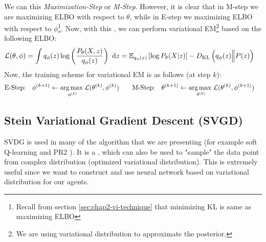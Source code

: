 We can this \textit{Maximization-Step} or \textit{M-Step}. However, it is clear that in M-step we are maximizing ELBO with respect to $\theta$, while in E-step we maximizing ELBO with respect to $\phi$\footnote{Recall from section \ref{sec:chap2-vi-technique} that minimizing KL is same as maximizing ELBO}. Now, with this , we can perform variational EM\footnote{We are using variational distribution to approximate the posterior.} based on the following ELBO:
\begin{equation}
    \begin{aligned}
        \mathcal{L}(\theta, \phi) &= \int q_{\phi}(z) \log \left( \frac{P_{\theta}(X, z)}{q_{\phi}(z)} \right) \ \mathrm{d} z
        = \mathbb{E}_{q_{\phi}(z)} \left[ \log P_{\theta}(X | z) \right] - D_{\mathrm{KL}}\left( q_{\phi}(z) \Big\| P(z) \right)
    \end{aligned}
\end{equation}
Now, the training scheme for variational EM is as follows (at step $k$):
\begin{equation}
    \begin{aligned}
        &\text{E-Step:} \quad \phi^{(k+1)} \leftarrow \underset{\phi^{(k)}}{\arg\max \ }\mathcal{L}(\theta^{(k)}, \phi^{(k)}) \qquad \text{M-Step:} \quad \theta^{(k+1)} \leftarrow \underset{\theta^{(k)}}{\arg\max \ }\mathcal{L}(\theta^{(k)}, \phi^{(k+1)})
    \end{aligned}
\end{equation}

\subsection{Stein Variational Gradient Descent (SVGD) \cite{liu2016stein}}
SVDG is used in many of the algorithm that we are presenting (for example soft Q-learning \cite{haarnoja2017reinforcement} and PR2 \cite{wen2019probabilistic}). It is a  \cite{liu2016stein}, which can also be used to "sample" the data point from complex distribution (optimized variational distribution). This is extremely useful since we want to construct and use neural network based on variational distribution for our agents. 


